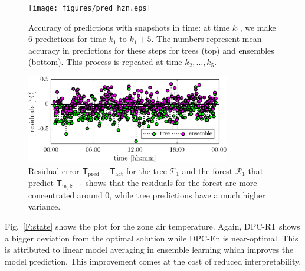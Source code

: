 \begin{figure}[t!]
\centering
\texttt{[image: figures/pred\_hzn.eps]}
\caption{Accuracy of predictions with snapshots in time: at time $k_1$, we make 6 predictions for time $k_1$ to $k_1+5$. The numbers represent mean accuracy in predictions for these steps for trees (top) and ensembles (bottom). This process is repeated at time $k_2, \ldots, k_5$.}
\captionsetup{justification=centering}
\label{F:pred_accuracy}
\end{figure}
\begin{figure}[t!]
\centering
\includegraphics[width=21pc]{figures/residual.eps}
\caption{Residual error $\mathsf{T}_{\mathrm{pred}} - \mathsf{T}_{\mathrm{act}}$ for the tree $\mathcal{T}_{1}$  and the forest $\mathcal{R}_1$ that predict $\mathsf{T}_{\mathrm{in,k+1}}$ shows that the residuals for the forest are more concentrated around 0, while tree predictions have a much higher variance.}
\captionsetup{justification=centering}
\label{F:residuals}
\end{figure}
Fig.~\ref{F:state} shows the plot for the zone air temperature. Again, DPC-RT shows a bigger deviation from the optimal solution while DPC-En is near-optimal. This is attributed to linear model averaging in ensemble learning which improves the model prediction. This improvement comes at the cost of reduced interpretability.


